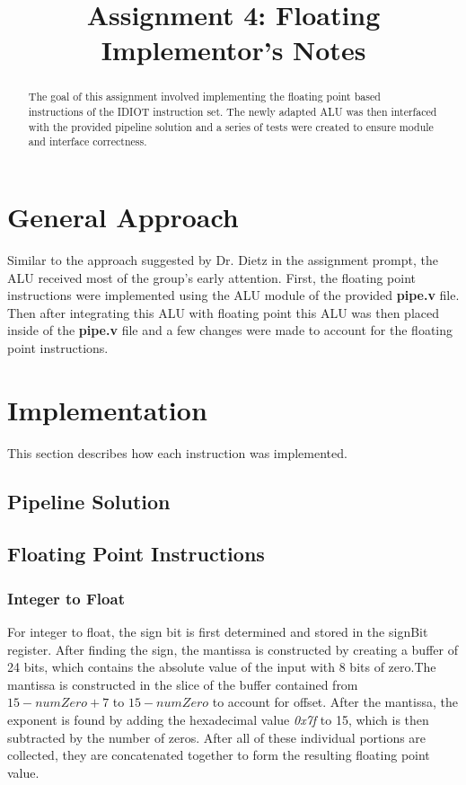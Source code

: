 \documentclass[conference]{IEEEtran}
\begin{document}
\title{Assignment 4: Floating\\Implementor's Notes}
\author{
        }

\maketitle

\begin{abstract}
The goal of this assignment involved implementing the floating point based
instructions of the IDIOT instruction set. The newly adapted ALU was then
interfaced with the provided pipeline solution and a series of tests were created
to ensure module and interface correctness.
\end{abstract}

\section{General Approach}
Similar to the approach suggested by Dr. Dietz in the assignment prompt, the ALU
received most of the group's early attention. First, the floating point instructions were 
implemented using the ALU module of the provided \textbf{pipe.v} file. Then after integrating
this ALU with floating point this ALU was then placed inside of the \textbf{pipe.v} file and a 
few changes were made to account for the floating point instructions.  

\section{Implementation}
This section describes how each instruction was implemented.

\subsection{Pipeline Solution}

\subsection{Floating Point Instructions}
\subsubsection{Integer to Float}
For integer to float, the sign bit is first determined and stored in the signBit register. After 
finding the sign, the mantissa is constructed by creating a buffer of 24 bits, which contains
the absolute value of the input with 8 bits of zero.The mantissa is constructed in the slice 
of the buffer contained from \(15-numZero +7\) to \(15-numZero\) to account for offset.
After the mantissa, the exponent is found by adding the hexadecimal value \textit{0x7f} to 15, 
which is then subtracted by the number of zeros. After all of these individual portions are 
collected, they are concatenated together to form the resulting floating point value. 
\end{document}
